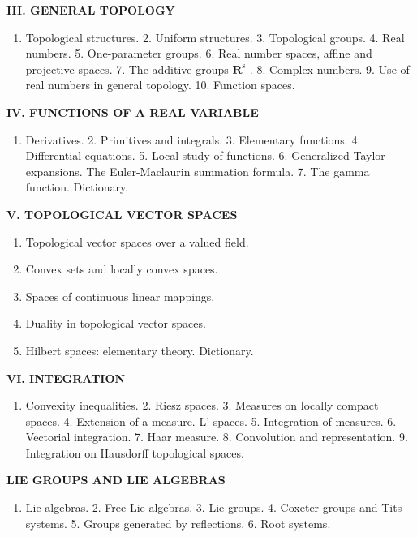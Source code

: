 \documentclass[12pt,a4paper,oneside]{book}
\providecommand{\tightlist}{\setlength{\itemsep}{0pt}\setlength{\parskip}{0pt}}
\begin{document}
\textbf{III. GENERAL TOPOLOGY}

\begin{enumerate}
\def\labelenumi{\arabic{enumi}.}
\tightlist
\item
  Topological structures. 2. Uniform structures. 3. Topological groups. 4. Real numbers. 5. One-parameter groups. 6. Real number spaces, affine and projective spaces. 7. The additive groups \(\mathbf{R}^{\mathrm{s}}\) . 8. Complex numbers. 9. Use of real numbers in general topology. 10. Function spaces.
\end{enumerate}

\textbf{IV. FUNCTIONS OF A REAL VARIABLE}

\begin{enumerate}
\def\labelenumi{\arabic{enumi}.}
\tightlist
\item
  Derivatives. 2. Primitives and integrals. 3. Elementary functions. 4. Differential equations. 5. Local study of functions. 6. Generalized Taylor expansions. The Euler-Maclaurin summation formula. 7. The gamma function. Dictionary.
\end{enumerate}

\textbf{V. TOPOLOGICAL VECTOR SPACES}

\begin{enumerate}
\def\labelenumi{\arabic{enumi}.}
\tightlist
\item
  Topological vector spaces over a valued field.
\item
  Convex sets and locally convex spaces.
\item
  Spaces of continuous linear mappings.
\item
  Duality in topological vector spaces.
\item
  Hilbert spaces: elementary theory. Dictionary.
\end{enumerate}

\textbf{VI. INTEGRATION}

\begin{enumerate}
\def\labelenumi{\arabic{enumi}.}
\tightlist
\item
  Convexity inequalities. 2. Riesz spaces. 3. Measures on locally compact spaces. 4. Extension of a measure. L' spaces. 5. Integration of measures. 6. Vectorial integration. 7. Haar measure. 8. Convolution and representation. 9. Integration on Hausdorff topological spaces.
\end{enumerate}


\textbf{LIE GROUPS AND LIE ALGEBRAS}

\begin{enumerate}
\def\labelenumi{\arabic{enumi}.}
\tightlist
\item
  Lie algebras. 2. Free Lie algebras. 3. Lie groups. 4. Coxeter groups and Tits systems. 5. Groups generated by reflections. 6. Root systems.
\end{enumerate}
\end{document}
